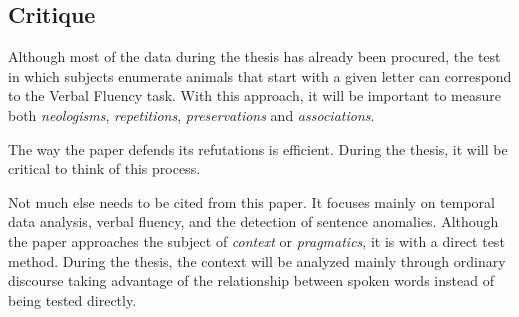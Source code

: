 \documentclass{Paper_Summary}
\begin{document}
\makepapertitle

\breakline

\begin{center}
    \section*{Critique}
\end{center}

    Although most of the data during the thesis has already been procured, the test in which subjects enumerate animals that start with a given letter can correspond to the Verbal Fluency task. With this approach, it will be important to measure both \emph{neologisms}, \emph{repetitions}, \emph{preservations} and \emph{associations}.

    The way the paper defends its refutations is efficient. During the thesis, it will be critical to think of this process.

    Not much else needs to be cited from this paper. It focuses mainly on temporal data analysis, verbal fluency, and the detection of sentence anomalies. Although the paper approaches the subject of \emph{context} or \emph{pragmatics}, it is with a direct test method. During the thesis, the context will be analyzed mainly through ordinary discourse taking advantage of the relationship between spoken words instead of being tested directly.

\breakline
\end{document}
